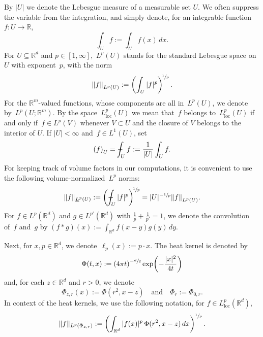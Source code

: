 \documentclass[11pt]{article} %
\numberwithin{equation}{section}
\theoremstyle{definition}
\let\originalleft\left
\let\originalright\right
\renewcommand{\left}{\mathopen{}\mathclose\bgroup\originalleft}
\renewcommand{\right}{\aftergroup\egroup\originalright}
\newcommand*{\R}{\ensuremath{\mathbb{R}}}
\newcommand*{\Rd}{\ensuremath{\mathbb{R}^d}}
\def\Xint#1{\mathchoice
{\XXint\displaystyle\textstyle{#1}}%
{\XXint\textstyle\scriptstyle{#1}}%
{\XXint\scriptstyle\scriptscriptstyle{#1}}%
{\XXint\scriptscriptstyle\scriptscriptstyle{#1}}%
\!\int}
\def\XXint#1#2#3{{\setbox0=\hbox{$#1{#2#3}{\int}$}
\vcenter{\hbox{$#2#3$}}\kern-.5\wd0}}
\def\fint{\Xint-}
\begin{document}
By $|U|$ we denote the Lebesgue measure of a measurable set $U$. We often suppress the variable from the integration, and simply denote, for an integrable function~$f:U \to \R$,
\begin{equation*} \label{}
\int_U f:=  \int_U f(x)\,dx. 
\end{equation*}
For $U\subseteq \Rd$ and $p\in[1,\infty]$,~$L^p(U)$ stands for the standard Lebesgue space on~$U$ with exponent~$p$, with the norm
\begin{equation*}  
\left\| f \right\|_{L^p(U)} := \biggl( \int_U | f |^p \biggr)^{\!\sfrac1p} \,.
\end{equation*}
For the $\R^m$-valued functions, whose components are all in~$L^p(U)$, we denote by~$L^p(U;\R^m)$. 
By the space~$L_{\mathrm{loc}}^p(U)$ we mean that~$f$ belongs to~$L_{\mathrm{loc}}^p(U)$ if and only if~$f \in L^p(V)$ whenever $V \subset U$ and the closure of $V$ belongs to the interior of $U$. If $|U| < \infty$ and~$f \in L^1(U)$, set
\begin{equation*}  %
\left( f \right)_U = \fint_U f := \frac 1 {|U|} \int_U f.
\end{equation*}
For keeping track of volume factors in our computations, it is convenient to use the following volume-normalized~$L^p$ norms:
\begin{equation} 
\label{e.volume.normalized}
\|f\|_{\underline{L}^p(U)} := \biggl( \fint_U |f|^p \biggr) ^{\!\sfrac 1 p} = | U |^{-\sfrac 1p} \left\| f \right\|_{L^p(U)}.
\end{equation}
For $f\in L^p(\Rd)$ and $g\in L^{p'}(\Rd)$ with $\frac1p+\frac1{p'}=1$, we denote the convolution of~$f$ and~$g$ by
$
( f\ast g )(x) := \int_{\Rd} f(x-y)g(y)\,dy.
$



\smallskip

Next, for $x,p\in\Rd$, we denote~$\ell_p(x):= p\cdot x$.  The heat kernel is denoted by
\begin{equation*} \label{}
\Phi(t,x):= \left( 4\pi t\right)^{-\sfrac d2} \exp\left( -\frac{|x|^2}{4t} \right)
\end{equation*}
and, for each $z\in\Rd$ and $r>0$, we denote
\begin{equation*} \label{}
\Phi_{z,r} (x):= \Phi(r^2, x-z) \quad \mbox{and} \quad \Phi_r := \Phi_{0,r}. 
\end{equation*}
In context of the heat kernels, we use the following notation, for $f \in L_{\mathrm{loc}}^p(\R^d)$, 
\begin{equation} 
\label{e.L2.Psi}
\| f  \|_{L^p(\Phi_{z,r})} 
:=
\biggl( \int_{\R^d} |f(x)|^p \, \Phi( r^2, x-z ) \, dx \biggr)^{\sfrac1p}
\,.
\end{equation}
\end{document}
